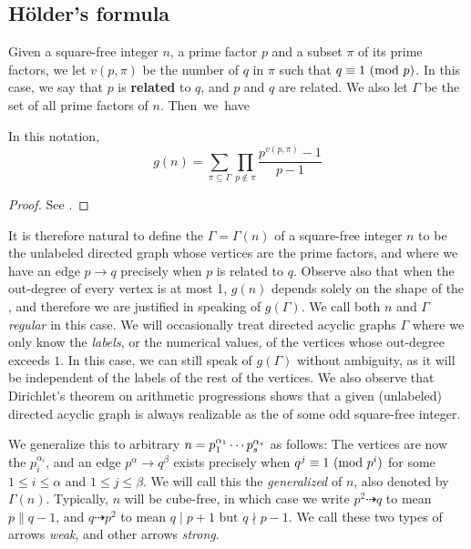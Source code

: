 \subsection{Hölder's formula}
Given a square-free integer $n$, a prime factor $p$ and a subset $\pi$ of its prime factors, we let $v(p, \pi)$ be the number of $q$ in $\pi$ such that $q \equiv 1 \ (\mathrm{mod} \ p)$.
In this case, we say that $p$ is \textbf{related} to $q$, and $p$ and $q$ are related.
We also let $\Gamma$ be the set of all prime factors of $n$.
\mbox{Then we have}
\begin{thm} In this notation,
	\begin{equation*}
		g(n) = \sum_{\pi \subseteq \Gamma} \prod_{p \notin \pi} \frac{p^{v(p, \pi)} - 1}{p - 1}
	\end{equation*}
\end{thm}
\begin{proof} See {\cite[Thm.~5.1]{gnumoas}}.
\end{proof}

It is therefore natural to define the \emph{} $\Gamma = \Gamma(n)$ of a square-free integer $n$ to be the unlabeled directed graph whose vertices are the prime factors, and where we have an edge $p \to q$ precisely when $p$ is related to $q$.
Observe also that when the out-degree of every vertex is at most 1, $g(n)$ depends solely on the shape of the , and therefore we are justified in speaking of $g(\Gamma)$.
We call both $n$ and $\Gamma$ \emph{regular} in this case.
We will occasionally treat directed acyclic graphs $\Gamma$ where we only know the \emph{labels}, or the numerical values, of the vertices whose out-degree exceeds $1$.
In this case, we can still speak of $g(\Gamma)$ without ambiguity, as it will be independent of the labels of the rest of the vertices.
We also observe that Dirichlet's theorem on arithmetic progressions shows that a given (unlabeled) directed acyclic graph is always realizable as the  of some odd square-free integer.

We generalize this to arbitrary $n = p_1^{\alpha_1} \cdots p_s^{\alpha_s}$ as follows: The vertices are now the $p_i^{\alpha_i}$, and an edge $p^\alpha \to q^\beta$ exists precisely when $q^j \equiv 1 \ (\mathrm{mod} \ p^i)$ for some $1 \le i \le \alpha$ and $1 \le j \le \beta$.
We will call this the \emph{generalized \hg} of $n$, also denoted by $\Gamma(n)$.
Typically, $n$ will be cube-free, in which case we write $p^2 \dashrightarrow q$ to mean $p \parallel q - 1$, and $q \dashrightarrow p^2$ to mean $q \mid p + 1$ but $q \nmid p - 1$.
We call these two types of arrows \emph{weak}, and other arrows \emph{strong}.

